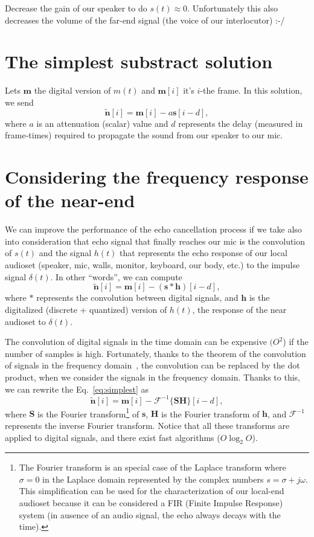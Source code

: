 Decrease the gain of our speaker to do $s(t)\approx 0$. Unfortunately
this also decreases the volume of the far-end signal (the voice of our
interlocutor) :-/

\section{The simplest substract solution}
Lets ${\mathbf m}$ the digital version of $m(t)$ and ${\mathbf m}[i]$
it's $i$-the frame. In this solution, we send
\begin{equation}
  \tilde{\mathbf n}[i] = {\mathbf m}[i] - a{\mathbf s}[i-d],
  \label{eq:simplest}
\end{equation}
where $a$ is an attenuation (scalar) value and $d$ represents the
delay (measured in frame-times) required to propagate the sound from
our speaker to our mic.

\section{Considering the frequency response of the near-end}
We can improve the performance of the echo cancellation process if we
take also into consideration that echo signal that finally reaches our mic
is the convolution of $s(t)$ and the signal $h(t)$ that represents
the echo response of our local audioset (speaker, mic, walls, monitor,
keyboard, our body, etc.) to the impulse signal $\delta(t)$. In other
``words'', we can compute
\begin{equation}
  \tilde{\mathbf n}[i] = {\mathbf m}[i] - ({\mathbf s}*{\mathbf h})[i-d],
  \label{eq:simplest}
\end{equation}
where $*$ represents the convolution between digital signals, and
${\mathbf h}$ is the digitalized (discrete + quantized) version of
$h(t)$, the response of the near audioset to $\delta(t)$.

The convolution of digital signals in the time domain can be expensive
$(O^2$) if the number of samples is high. Fortunately, thanks to the
theorem of the convolution of signals in the frequency
domain~\cite{kovacevic2013fourier,Oppenheim2}, the convolution can be
replaced by the dot product, when we consider the signals in the
frequency domain. Thanks to this, we can rewrite the
Eq.~\eqref{eq:simplest} as
\begin{equation}
  \tilde{\mathbf n}[i] = {\mathbf m}[i] - {\mathcal F}^{-1}\{{\mathbf S}{\mathbf H}\}[i-d],
  \label{eq:simplest_and_faster}
\end{equation}
where ${\mathbf S}$ is the Fourier transform\footnote{The Fourier
  transform is an special case of the Laplace transform where
  $\sigma=0$ in the Laplace domain represented by the complex numbers
  $s=\sigma+j\omega$. This simplification can be used for the
  characterization of our local-end audioset because it can be
  considered a FIR (Finite Impulse Response) system (in ausence of an
  audio signal, the echo always decays with the time).} of
${\mathbf s}$, ${\mathbf H}$ is the Fourier transform of
${\mathbf h}$, and ${\mathcal F}^{-1}$ represents the inverse Fourier
transform. Notice that all these transforms are applied to digital
signals, and there exist fast algorithms ($O\log_2O$).

